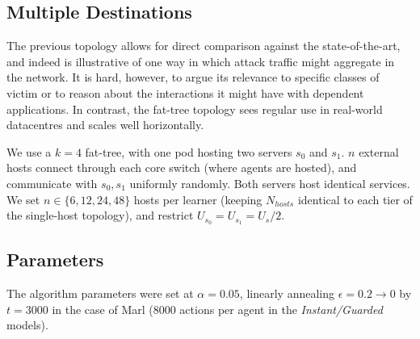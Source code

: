 \documentclass[10pt, times, comsoc]{IEEEtran}
\begin{document}
\subsection{Multiple Destinations}
The previous topology allows for direct comparison against the state-of-the-art, and indeed is illustrative of one way in which attack traffic might aggregate in the network.
It is hard, however, to argue its relevance to specific classes of victim or to reason about the interactions it might have with dependent applications.
In contrast, the fat-tree topology \cite{DBLP:conf/sigcomm/Al-FaresLV08} sees regular use in real-world datacentres and scales well horizontally.

We use a $k=4$ fat-tree, with one pod hosting two servers $s_0$ and $s_1$.
$n$ external hosts connect through each core switch (where agents are hosted), and communicate with $s_0, s_1$ uniformly randomly.
Both servers host identical services.
We set $n \in \{6, 12, 24, 48\}$ hosts per learner (keeping $N_{\mathit{hosts}}$ identical to each tier of the single-host topology), and restrict $U_{s_0} = U_{s_1} = U_s / 2$.

\subsection{Parameters}
The algorithm parameters were set at $\alpha=0.05$, linearly annealing $\epsilon=0.2 \rightarrow 0$ by $t=3000$ in the case of Marl (\num{8000} actions per agent in the \emph{Instant/Guarded} models).
\end{document}
